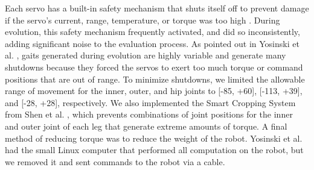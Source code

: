 Each servo has a built-in safety mechanism that shuts itself off to prevent damage if the servo's current, range, temperature, or torque was too high \cite{robotis}. During evolution, this safety mechanism frequently activated, and did so inconsistently, adding significant noise to the evaluation process. As pointed out in Yosinski et al. \cite{yos:clune}, gaits generated during evolution are highly variable and generate many shutdowns because they forced the servos to exert too much torque or command positions that are out of range. %
To minimize shutdowns, we limited the allowable range of movement for the inner, outer, and hip joints to [-85\degree, +60\degree], [-113\degree, +39\degree], and [-28\degree, +28\degree], respectively. We also implemented the Smart Cropping System from Shen et al. \cite{haocheng}, which prevents combinations of joint positions for the inner and outer joint of each leg that generate extreme amounts of torque. A final method of reducing torque was to reduce the weight of the robot. Yosinski et al.~\cite{yos:clune} had the small Linux computer that performed all computation on the robot, but we removed it and sent commands to the robot via a cable. 







